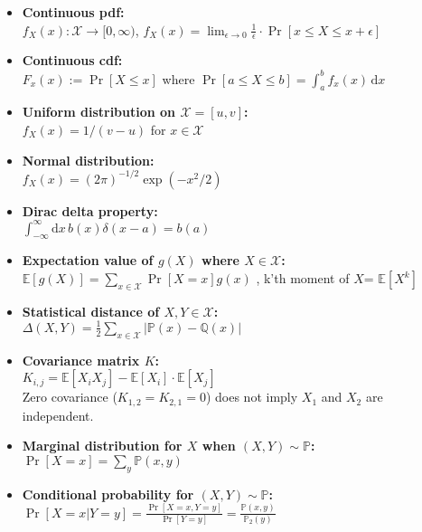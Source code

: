 \documentclass[twocolumn,9pt]{extarticle}
\begin{document}
\begin{itemize}
	\setlength\itemsep{0.05cm}
	\item \textbf{Continuous pdf: } \\
	$f_X(x) : \mathcal{X} \rightarrow [0,\infty)$, $f_X(x) = \lim_{\epsilon \to 0} \frac{1}{\epsilon} \cdot \Pr[x \leq X \leq x + \epsilon]$

	\item \textbf{Continuous cdf: } \\
	$F_x(x) := \Pr[X \leq x]$ where $\Pr[a \leq X \leq b] = \int_a^b f_x(x) \, \mathrm{d} x$

	\item \textbf{Uniform distribution on $\mathcal{X} = [u,v]$: } \\
	$f_X(x) = 1/(v - u)$ for $x \in \mathcal{X}$

	\item \textbf{Normal distribution: } \\
	$f_X(x) = (2\pi)^{-1/2} \exp(-x^2/2)$

	\item \textbf{Dirac delta property: } \\
	$\int_{-\infty}^\infty \mathrm{d} x \, b(x)\delta(x-a) = b(a)$

	\item \textbf{Expectation value of $g(X)$ where $X \in \mathcal{X}$: } \\
	$\mathbb{E}[g(X)] = \sum_{x \in \mathcal{X}} \Pr[X = x] g(x)$
	, k'th moment of $X$= $\mathbb{E}[X^k]$

	\item \textbf{Statistical distance of $X, Y \in \mathcal{X}$: } \\
	$\Delta(X,Y) = \frac{1}{2} \sum_{x \in \mathcal{X}} |\mathbb{P}(x) - \mathbb{Q}(x)|$

	\item \textbf{Covariance matrix $K$: } \\
	$K_{i,j} = \mathbb{E}[X_i X_j] - \mathbb{E}[X_i] \cdot \mathbb{E}[X_j]$\\
	Zero covariance ($K_{1,2} = K_{2,1} = 0$) does not imply $X_1$ and $X_2$ are independent.

	\item \textbf{Marginal distribution for $X$ when $(X,Y) \sim \mathbb{P}$: } \\
	$\Pr[X = x] = \sum_y \mathbb{P}(x,y)$

	\item \textbf{Conditional probability for $(X,Y) \sim \mathbb{P}$: } \\
	$\Pr[X = x|Y = y] = \frac{\Pr[X = x, Y = y]}{\Pr[Y = y]} = \frac{\mathbb{P}(x,y)}{\mathbb{P}_2(y)}$


\end{itemize}
\end{document}
